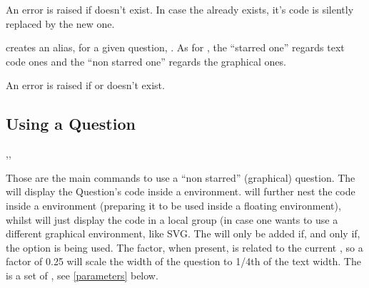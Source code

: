 \documentclass[10pt]{article}
\begin{document}
\begin{tsremark}
An error is raised if  doesn't exist. In case the  already exists, it's code is silently replaced by the new one.
\end{tsremark}


\begin{codedescribe}{}
\begin{codesyntax}%
\end{codesyntax}
 creates an alias,  for a given question, . As for , the ``starred one'' regards text code ones and the ``non starred one'' regards the graphical ones.
\end{codedescribe}

\begin{tsremark}
An error is raised if  or  doesn't exist.
\end{tsremark}


\subsection{Using a Question}\label{question use}
\begin{codedescribe}{\ftikzQuestion,\tikzQuestion,\rawtikzQuestion}
\begin{codesyntax}%
\tsobj{\ftikzQuestion}
\tsobj{\tikzQuestion}
\tsobj{\rawtikzQuestion}
\end{codesyntax}
Those are the main commands to use a ``non starred'' (graphical) question.
The \tsobj{\tikzQuestion} will display the Question's code inside a  environment. \tsobj{\ftikzQuestion} will further nest the code inside a  environment (preparing it to be used inside a floating environment), whilst \tsobj{\rawtikzQuestion} will just display the code in a local group (in case one wants to use a different graphical environment, like SVG. The  will only be added if, and only if, the  option is being used. The  factor, when present, is related to the current \tsobj{\textwidth}, so a factor of 0.25 will scale the width of the question to 1/4th of the text width. The  is a set of , see \ref{parameters} below.
\end{codedescribe}
\end{document}
